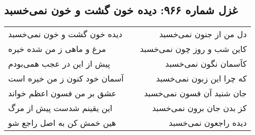 \begin{center}
\section*{غزل شماره ۹۶۶: دیده خون گشت و خون نمی‌خسبد}
\label{sec:0966}
\begin{longtable}{l p{0.5cm} r}
دیده خون گشت و خون نمی‌خسبد
&&
دل من از جنون نمی‌خسبد
\\
مرغ و ماهی ز من شده خیره
&&
کاین شب و روز چون نمی‌خسبد
\\
پیش از این در عجب همی‌بودم
&&
کآسمان نگون نمی‌خسبد
\\
آسمان خود کنون ز من خیره است
&&
که چرا این زبون نمی‌خسبد
\\
عشق بر من فسون اعظم خواند
&&
جان شنید آن فسون نمی‌خسبد
\\
این یقینم شدست پیش از مرگ
&&
کز بدن جان برون نمی‌خسبد
\\
هین خمش کن به اصل راجع شو
&&
دیده راجعون نمی‌خسبد
\\
\end{longtable}
\end{center}
